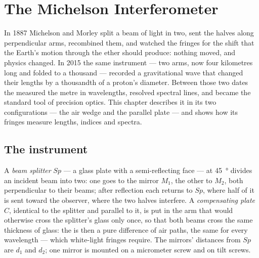 \chapter{The Michelson Interferometer}\label{ch:b2:michelson}

In 1887 Michelson and Morley split a beam of light in two, sent the
halves along perpendicular arms, recombined them, and watched the
fringes for the shift that the Earth's motion through the ether should
produce: nothing moved, and physics changed. In 2015 the same
instrument --- two arms, now four kilometres long and folded to a
thousand --- recorded a gravitational wave that changed their lengths
by a thousandth of a proton's diameter. Between those two dates the
 measured the metre in wavelengths, resolved
spectral lines, and became the standard tool of precision optics.
This chapter describes it in its two configurations --- the air wedge
and the parallel plate --- and shows how its fringes measure lengths,
indices and spectra.

\section{The instrument}

\begin{definition}\label{def:b2:michelson:instrument}
A \emph{beam splitter} $Sp$ --- a glass plate with a semi-reflecting face
--- at \qty{45}{\degree} divides an incident beam into two: one goes to the
mirror $M_1$, the other to $M_2$, both perpendicular to their beams; after
reflection each returns to $Sp$, where half of it is sent toward the
observer, where the two halves interfere. A \emph{compensating plate}
$C$, identical to the splitter and parallel to it, is put in the arm
that would otherwise cross the splitter's glass only once, so that both
beams cross the same thickness of glass: the  is then a
pure difference of air paths, the same for every wavelength --- which
white-light fringes require. The mirrors' distances from $Sp$ are $d_1$
and $d_2$; one mirror is mounted on a micrometer screw and on tilt
screws.
\end{definition}

